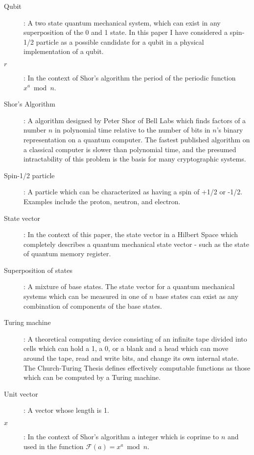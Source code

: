 \documentclass[]{article}
\begin{document}
\begin{description}
\item[Qubit]:
	A two state quantum mechanical system, which can exist in any
superposition of the 0 and 1 state.  In this paper I have considered a
spin-1/2 particle as a possible candidate for a qubit in a physical
implementation of a qubit.

\item[$r$]:
	In the context of Shor's algorithm the period of the periodic
function $x^{a} \bmod n$.

\item[Shor's Algorithm]: A algorithm designed by Peter Shor of Bell
  Labs which finds factors of a number $n$ in polynomial time relative
  to the number of bits in $n$'s binary representation on a quantum
  computer.  The fastest published algorithm on a classical computer
  is slower than polynomial time, and the presumed intractability of
  this problem is the basis for many cryptographic systems.
	
\item[Spin-1/2 particle]: 
      A particle which can be characterized as
  having a spin of +1/2 or -1/2.  Examples include the proton, neutron, and electron.

\item[State vector]:
	In the context of this paper, the state vector in a Hilbert Space which completely describes a quantum mechanical state vector - such as the state of quantum memory register.

\item[Superposition of states]:
	A mixture of base states.  The state vector for a quantum
mechanical systems which can be measured in one of $n$ base states can
exist as any combination of components of the base states.

\item[Turing machine]:
	A theoretical computing device consisting of an infinite tape
divided into cells which can hold a 1, a 0, or a blank and a head
which can move around the tape, read and write bits, and change its
own internal state.  The Church-Turing Thesis defines effectively computable functions as those which can be computed by a Turing machine.

\item[Unit vector]:
	A vector whose length is 1.

\item[$x$]:
	In the context of Shor's algorithm a integer which is coprime
to $n$ and used in the function $\mathcal{F}(a) = x^{a} \bmod n$.

\end{description}
\end{document}
